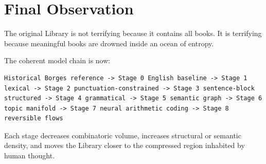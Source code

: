 \documentclass[11pt,a4paper]{article}
\begin{document}
\section{Final Observation}

The original Library is not terrifying because it contains all books. It is terrifying because meaningful books are drowned inside an ocean of entropy.

The coherent model chain is now:

\begin{lstlisting}[style=textstyle]
Historical Borges reference -> Stage 0 English baseline -> Stage 1 lexical -> Stage 2 punctuation-constrained -> Stage 3 sentence-block structured -> Stage 4 grammatical -> Stage 5 semantic graph -> Stage 6 topic manifold -> Stage 7 neural arithmetic coding -> Stage 8 reversible flows
\end{lstlisting}

Each stage decreases combinatoric volume, increases structural or semantic density, and moves the Library closer to the compressed region inhabited by human thought.
\end{document}
